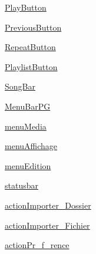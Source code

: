 \begin{DoxyCompactItemize}
\item 
\hyperlink{classtestIG_1_1Ui__ProjetGherkin_a4a1837c84129b0775a0f54d1d901f2a1}{PlayButton}
\item 
\hyperlink{classtestIG_1_1Ui__ProjetGherkin_aab265865d3cf9fe2f8a4c4aec6958acf}{PreviousButton}
\item 
\hyperlink{classtestIG_1_1Ui__ProjetGherkin_a4850cd338a20bdd1d2601a0151a09c75}{RepeatButton}
\item 
\hyperlink{classtestIG_1_1Ui__ProjetGherkin_ab7f4fed5a7a52006ab741657e8b3cc50}{PlaylistButton}
\item 
\hyperlink{classtestIG_1_1Ui__ProjetGherkin_a3fa94e337902a1d79b717d25e74f8ef8}{SongBar}
\item 
\hyperlink{classtestIG_1_1Ui__ProjetGherkin_ac5511d7527ea6d133d19abc657a9966f}{MenuBarPG}
\item 
\hyperlink{classtestIG_1_1Ui__ProjetGherkin_acaf7abd7fe46e82c56c9a8626e9323d7}{menuMedia}
\item 
\hyperlink{classtestIG_1_1Ui__ProjetGherkin_a86d88b84d3ced5bb74ab94294f9dcb61}{menuAffichage}
\item 
\hyperlink{classtestIG_1_1Ui__ProjetGherkin_af85ac704eefabfc3a2d7a2f26de5b89b}{menuEdition}
\item 
\hyperlink{classtestIG_1_1Ui__ProjetGherkin_a5c5a9bb2ea7c94372133c0ef210785e5}{statusbar}
\item 
\hyperlink{classtestIG_1_1Ui__ProjetGherkin_a503f806cb64568cfdddbda9894e4ce6c}{actionImporter\_\-Dossier}
\item 
\hyperlink{classtestIG_1_1Ui__ProjetGherkin_a3710d045195e2e51fbae7909dbdb3f3e}{actionImporter\_\-Fichier}
\item 
\hyperlink{classtestIG_1_1Ui__ProjetGherkin_a94b1935e1d170f76d0d3ced6b1c133cd}{actionPr\_\-f\_\-rence}
\end{DoxyCompactItemize}


